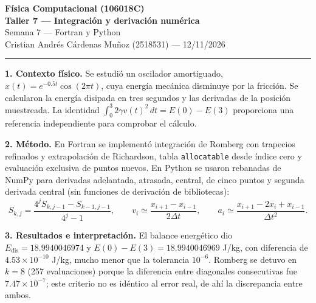 \documentclass[10pt,a4paper]{article}
\begin{document}
\begin{center}
{\large\bfseries Física Computacional (106018C)}\\[2pt]
{\bfseries Taller 7 --- Integración y derivación numérica}\\[2pt]
Semana 7 --- Fortran y Python\\[2pt]
Cristian Andrés Cárdenas Muñoz (2518531) --- 12/11/2026
\end{center}
\vspace{1pt}\hrule\vspace{5pt}

\textbf{1. Contexto físico.}
Se estudió un oscilador amortiguado, $x(t)=e^{-0.5t}\cos(2\pi t)$, cuya energía mecánica disminuye por la fricción. Se calcularon la energía disipada en tres segundos y las derivadas de la posición muestreada. La identidad $\int_0^3 2\gamma v(t)^2\,dt=E(0)-E(3)$ proporciona una referencia independiente para comprobar el cálculo.

\textbf{2. Método.}
En Fortran se implementó integración de Romberg con trapecios refinados y extrapolación de Richardson, tabla \texttt{allocatable} desde índice cero y evaluación exclusiva de puntos nuevos. En Python se usaron rebanadas de NumPy para derivadas adelantada, atrasada, central, de cinco puntos y segunda derivada central (sin funciones de derivación de bibliotecas):
\[
 S_{k,j}=\frac{4^jS_{k,j-1}-S_{k-1,j-1}}{4^j-1},\qquad
 v_i\simeq\frac{x_{i+1}-x_{i-1}}{2\Delta t},\qquad
 a_i\simeq\frac{x_{i+1}-2x_i+x_{i-1}}{\Delta t^2}.
\]

\textbf{3. Resultados e interpretación.}
El balance energético dio $E_{\mathrm{dis}}=18.9940046974$ y $E(0)-E(3)=18.9940046969$ J/kg, con diferencia de $4.53\times10^{-10}$ J/kg, mucho menor que la tolerancia $10^{-6}$. Romberg se detuvo en $k=8$ (257 evaluaciones) porque la diferencia entre diagonales consecutivas fue $7.47\times10^{-7}$; este criterio no es idéntico al error real, de ahí la discrepancia entre ambos.
\end{document}
